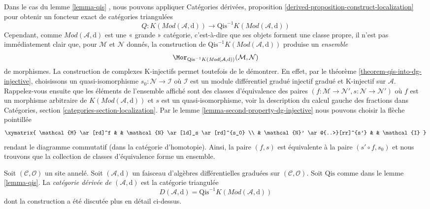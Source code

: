 \noindent
Dans le cas du lemme \ref{lemma-qis} , nous pouvons appliquer Catégories dérivées, proposition \ref{derived-proposition-construct-localization}  pour obtenir un foncteur exact de catégories triangulées
$$
Q :
K(\textit{Mod}(\mathcal{A}, \text{d}))
\longrightarrow
\text{Qis}^{-1}K(\textit{Mod}(\mathcal{A}, \text{d}))
$$
Cependant, comme $\textit{Mod}(\mathcal{A}, \text{d})$ est une « grande » catégorie, c'est-à-dire que ses objets forment une classe propre, il n'est pas immédiatement clair que, pour $\mathcal{M}$ et $\mathcal{N}$ donnés, la construction de $\text{Qis}^{-1}K(\textit{Mod}(\mathcal{A}, \text{d}))$ produise un {\it ensemble}
$$
\Mor_{\text{Qis}^{-1}K(\textit{Mod}(\mathcal{A}, \text{d}))}
(\mathcal{M}, \mathcal{N})
$$
de morphismes.
La construction de complexes K-injectifs permet toutefois de le démontrer.
En effet, par le théorème \ref{theorem-qis-into-dg-injective}, choisissons un quasi-isomorphisme $s_0 : \mathcal{N} \to \mathcal{I}$ où $\mathcal{I}$ est un module différentiel gradué injectif gradué et K-injectif sur $\mathcal{A}$.
Rappelez-vous ensuite que les éléments de l'ensemble affiché sont des classes d'équivalence des paires $(f : \mathcal{M} \to \mathcal{N}', s : \mathcal{N} \to \mathcal{N}')$ où $f$ est un morphisme arbitraire de $K(\textit{Mod}(\mathcal{A}, \text{d}))$ et $s$ est un quasi-isomorphisme, voir la description du calcul gauche des fractions dans Catégories, section \ref{categories-section-localization}.
Par le lemme \ref{lemma-second-property-dg-injective}  nous pouvons choisir la flèche pointillée
$$
\xymatrix{
\mathcal{M} \ar[rd]^f & &
\mathcal{N} \ar[ld]_s \ar[rd]^{s_0} \\
& \mathcal{N}' \ar@{..>}[rr]^{s'} & & \mathcal{I}
}
$$
rendant le diagramme commutatif (dans la catégorie d'homotopie).
Ainsi, la paire $(f, s)$ est équivalente à la paire $(s' \circ f, s_0)$ et nous trouvons que la collection de classes d'équivalence forme un ensemble.

\begin{definition}
\label{definition-derived-category}
Soit $(\mathcal{C}, \mathcal{O})$ un site annelé.
Soit $(\mathcal{A}, \text{d})$ un faisceau d'algèbres différentielles graduées sur $(\mathcal{C}, \mathcal{O})$.
Soit $\text{Qis}$ comme dans le lemme \ref{lemma-qis}.
La {\it catégorie dérivée de $(\mathcal{A}, \text{d})$} est la catégorie triangulée
$$
D(\mathcal{A}, \text{d}) =
\text{Qis}^{-1}K(\textit{Mod}(\mathcal{A}, \text{d}))
$$
dont la construction a été discutée plus en détail ci-dessus.
\end{definition}

